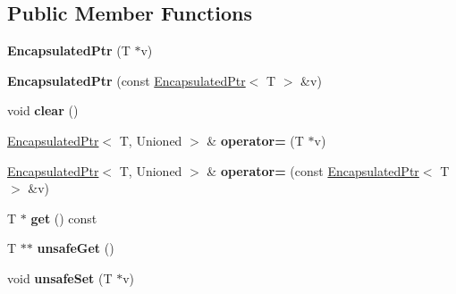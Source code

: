 \subsection*{Public Member Functions}
\begin{DoxyCompactItemize}
\item 
\hypertarget{classjs_1_1_encapsulated_ptr_ad7cee0b33eed0374b60bed5f5dd904b0}{{\bfseries Encapsulated\-Ptr} (T $\ast$v)}\label{classjs_1_1_encapsulated_ptr_ad7cee0b33eed0374b60bed5f5dd904b0}

\item 
\hypertarget{classjs_1_1_encapsulated_ptr_a26be2bafc7ab356aab2e3c57e44c1fe0}{{\bfseries Encapsulated\-Ptr} (const \hyperlink{classjs_1_1_encapsulated_ptr}{Encapsulated\-Ptr}$<$ T $>$ \&v)}\label{classjs_1_1_encapsulated_ptr_a26be2bafc7ab356aab2e3c57e44c1fe0}

\item 
\hypertarget{classjs_1_1_encapsulated_ptr_a7d5892987e073ecc3d7dbb67f144840b}{void {\bfseries clear} ()}\label{classjs_1_1_encapsulated_ptr_a7d5892987e073ecc3d7dbb67f144840b}

\item 
\hypertarget{classjs_1_1_encapsulated_ptr_a1fbe1ef3fa3ebcc5a291a904c3099c22}{\hyperlink{classjs_1_1_encapsulated_ptr}{Encapsulated\-Ptr}$<$ T, Unioned $>$ \& {\bfseries operator=} (T $\ast$v)}\label{classjs_1_1_encapsulated_ptr_a1fbe1ef3fa3ebcc5a291a904c3099c22}

\item 
\hypertarget{classjs_1_1_encapsulated_ptr_a783ad0cf3bfa37e5734d7517147d312f}{\hyperlink{classjs_1_1_encapsulated_ptr}{Encapsulated\-Ptr}$<$ T, Unioned $>$ \& {\bfseries operator=} (const \hyperlink{classjs_1_1_encapsulated_ptr}{Encapsulated\-Ptr}$<$ T $>$ \&v)}\label{classjs_1_1_encapsulated_ptr_a783ad0cf3bfa37e5734d7517147d312f}

\item 
\hypertarget{classjs_1_1_encapsulated_ptr_a14ca460381754f6f61ce1ffc21b59de1}{T $\ast$ {\bfseries get} () const }\label{classjs_1_1_encapsulated_ptr_a14ca460381754f6f61ce1ffc21b59de1}

\item 
\hypertarget{classjs_1_1_encapsulated_ptr_a754736eb82338433a6ca36bb7b402c70}{T $\ast$$\ast$ {\bfseries unsafe\-Get} ()}\label{classjs_1_1_encapsulated_ptr_a754736eb82338433a6ca36bb7b402c70}

\item 
\hypertarget{classjs_1_1_encapsulated_ptr_adf42e75196f1f6e45073e9adac3eee7a}{void {\bfseries unsafe\-Set} (T $\ast$v)}\label{classjs_1_1_encapsulated_ptr_adf42e75196f1f6e45073e9adac3eee7a}


\end{DoxyCompactItemize}
